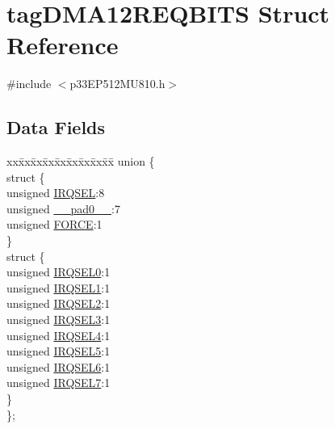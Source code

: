 \hypertarget{structtag_d_m_a12_r_e_q_b_i_t_s}{}\section{tag\+D\+M\+A12\+R\+E\+Q\+B\+I\+TS Struct Reference}
\label{structtag_d_m_a12_r_e_q_b_i_t_s}


{\ttfamily \#include $<$p33\+E\+P512\+M\+U810.\+h$>$}

\subsection*{Data Fields}
\begin{DoxyCompactItemize}
\item 
\begin{tabbing}
xx\=xx\=xx\=xx\=xx\=xx\=xx\=xx\=xx\=\kill
union \{\\
\>struct \{\\
\>\>unsigned \hyperlink{structtag_d_m_a12_r_e_q_b_i_t_s_a5e70ba01366ab2f37371d52661dd93b2}{IRQSEL}:8\\
\>\>unsigned \hyperlink{structtag_d_m_a12_r_e_q_b_i_t_s_adf71f3d8410c1f1dbbc96680a92c49af}{\_\_pad0\_\_}:7\\
\>\>unsigned \hyperlink{structtag_d_m_a12_r_e_q_b_i_t_s_a9b378a7ffc1ab4bc4a3710fb36389180}{FORCE}:1\\
\>\} \\
\>struct \{\\
\>\>unsigned \hyperlink{structtag_d_m_a12_r_e_q_b_i_t_s_ac73241b8f783760c9192dfd8a0773cad}{IRQSEL0}:1\\
\>\>unsigned \hyperlink{structtag_d_m_a12_r_e_q_b_i_t_s_a45e1f083e5a8a59f25acc35910732426}{IRQSEL1}:1\\
\>\>unsigned \hyperlink{structtag_d_m_a12_r_e_q_b_i_t_s_a60dda7474727b3624ca25fa0067a8924}{IRQSEL2}:1\\
\>\>unsigned \hyperlink{structtag_d_m_a12_r_e_q_b_i_t_s_aeaafe1b8c89398ed382054ab628aed78}{IRQSEL3}:1\\
\>\>unsigned \hyperlink{structtag_d_m_a12_r_e_q_b_i_t_s_a91c4162e0f3d4ac7adcdb49302f19840}{IRQSEL4}:1\\
\>\>unsigned \hyperlink{structtag_d_m_a12_r_e_q_b_i_t_s_a6382d50430464cf20b3dee3dbf2e8c01}{IRQSEL5}:1\\
\>\>unsigned \hyperlink{structtag_d_m_a12_r_e_q_b_i_t_s_ace52408ef8c29561f3c56a3fbcbc8217}{IRQSEL6}:1\\
\>\>unsigned \hyperlink{structtag_d_m_a12_r_e_q_b_i_t_s_acce7dedecdf1f53cdbead3edf7c5d53a}{IRQSEL7}:1\\
\>\} \\
\}; \\

\end{tabbing}\end{DoxyCompactItemize}


